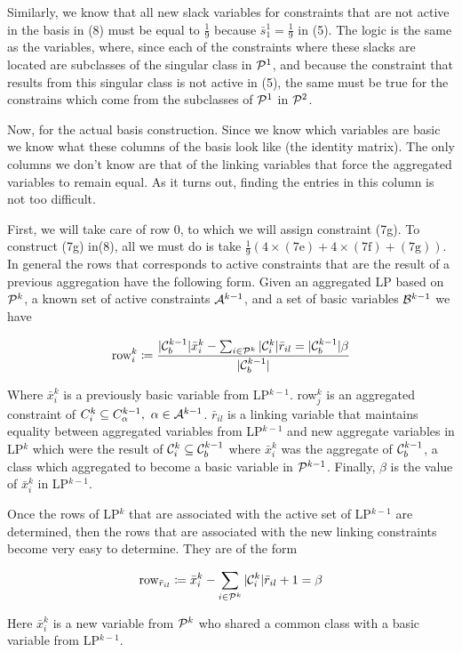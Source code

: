 \documentclass[11pt]{article} %
\newcommand{\cP}{{\cal P}}
\newcommand{\cA}{{\cal A}}
\newcommand{\cC}{{\cal C}}
\newcommand{\cB}{{\cal B}}
\begin{document}
	Similarly, we know that all new slack variables for constraints that are not active in the basis in (8) must be equal to $\frac{1}{9}$ because $\bar{s}_1^1 = \frac{1}{9}$ in (5).  The logic is the same as the variables, where, since each of the constraints where these slacks are located are subclasses of the singular class in $\cP^1$, and because the constraint that results from this singular class is not active in (5), the same must be true for the constrains which come from the subclasses of $\cP^1$ in $\cP^2$.
	
	Now, for the actual basis construction.  Since we know which variables are basic we know what these columns of the basis look like (the identity matrix).  The only columns we don't know are that of the linking variables that force the aggregated variables to remain equal.  As it turns out, finding the entries in this column is not too difficult.
	
	First, we will take care of row 0, to which we will assign constraint (7g).  To construct (7g) in(8), all we must do is take $\frac{1}{9}(4 \times (7\text{e}) + 4 \times (7\text{f}) + (7\text{g}))$.  In general the rows that corresponds to active constraints that are the result of a previous aggregation have the following form.  Given an aggregated LP based on $\cP^k$, a known set of active constraints $\cA^{k - 1}$, and a set of basic variables $\cB^{k - 1}$ we have
	
	\begin{equation}
	\text{row}_{i}^k \coloneqq \frac{|\cC_b^{k - 1}|\bar{x}_i^k - \sum_{i \in \cP^k}|\cC^k_i|\bar{r}_{il} = |\cC^{k - 1}_b|\beta}{|\cC_b^{k - 1}|}
	\end{equation}
	
	Where $\bar{x}_i^k$ is a previously basic variable from LP$^{k - 1}$.  row$_j^k$ is an aggregated constraint of $C_i^k \subseteq C_\alpha^{k - 1}, \ \alpha \in \cA^{k - 1}$.  $\bar{r}_{il}$ is a linking variable that maintains equality between aggregated variables from LP$^{k - 1}$ and new aggregate variables in LP$^k$ which were the result of $\cC_i^k \subseteq \cC_b^{k - 1}$ where $\bar{x}_i^k$ was the aggregate of $\cC_b^{k - 1}$, a class which aggregated to become a basic variable in $\cP^{k - 1}$.  Finally, $\beta$ is the value of $\bar{x}_i^k$ in LP$^{k - 1}$.
		
	Once the rows of LP$^k$ that are associated with the active set of LP$^{k - 1}$ are determined, then the rows that are associated with the new linking constraints become very easy to determine.  They are of the form 
	
	\begin{equation}
	\text{row}_{\bar{r}_{il}} \coloneqq \bar{x}_i^k - \sum_{i \in \cP^k}|\cC^k_i|\bar{r}_{il} + 1 =\beta
	\end{equation} 
	
	Here $\bar{x}_i^k$ is a new variable from $\cP^k$ who shared a common class with a basic variable from LP$^{k - 1}$. 
	
 
\end{document}
